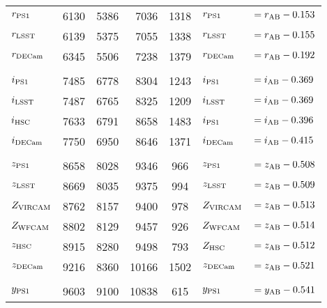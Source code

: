 \documentclass[usenatbib]{mnras}
\begin{document}
\begin{table*}
\begin{center}
\begin{tabular}{l r r r  c l l}
      $r_{\rm PS1}$         &    6130    & 	  5386    &    7036   &   1318       &  $r_{\rm PS1}   $       &$     = r_{\rm AB} - 0.153 $ \\ %
      $r_{\rm LSST}$       &     6139    &	  5375    &    7055   &   1338      &  $r_{\rm LSST}   $       &$    = r_{\rm AB} - 0.155 $ \\	
      $r_{\rm DECam}$   &      6345    &    5506    &    7238   &   1379      &  $r_{\rm DECam}$       &$   = r_{\rm AB} - 0.192 $ \\	     
      &&&&&&\\
      $i_{\rm PS1}$         &    7485    &     6778    &    8304   &   1243      &  $i_{\rm PS1}    $       &$   = i_{\rm AB} - 0.369 $ \\  %
      $i_{\rm LSST}$       &     7487    &	  6765    &     8325   &   1209      &  $i_{\rm LSST}   $       &$    = i_{\rm AB} - 0.369 $ \\   %
      $i_{\rm HSC}$         &   7633    &     6791    &     8658	&   1483       &  $i_{\rm PS1}    $       &$   = i_{\rm AB} - 0.396 $ \\  %
      $i_{\rm DECam}$   &      7750   &	  6950    &     8646    &   1371      &  $i_{\rm DECam} $     &$  = i_{\rm AB} - 0.415 $        \\	   
      &&&&&&\\
      $z_{\rm PS1}$        &    8658    &	 8028    &      9346   &      966      &  $z_{\rm PS1}   $      &$    = z_{\rm AB} - 0.508 $       \\
      $z_{\rm LSST}$      &     8669   & 	 8035    &      9375   &      994     &   $z_{\rm LSST}  $      &$    = z_{\rm AB} - 0.509 $     \\
      $Z_{\rm VIRCAM}$  &     8762   & 	 8157    &      9400   &      978    &   $Z_{\rm VIRCAM}  $   &$    = z_{\rm AB} - 0.513 $     \\
      $Z_{\rm WFCAM}$  &     8802   & 	 8129    &      9457   &      926    &   $Z_{\rm WFCAM}  $   &$    = z_{\rm AB} - 0.514 $     \\
      $z_{\rm HSC}$        &    8915  &   	8280     &      9498	&    793      & 	$Z_{\rm HSC} $         &$    = z_{\rm AB} - 0.512$     \\
      $z_{\rm DECam}$  &      9216   & 	 8360    &    10166   &   1502      &  $z_{\rm DECam} $     &$   = z_{\rm AB} - 0.521 $ \\
      &&&&&&\\
      $y_{\rm PS1}$       &       9603    &  9100    &    10838  &     615       &  $y_{\rm PS1}    $       &$   = y_{\rm AB} -  0.541 $ \\

\end{tabular}
\end{center}
\end{table*}
\end{document}
